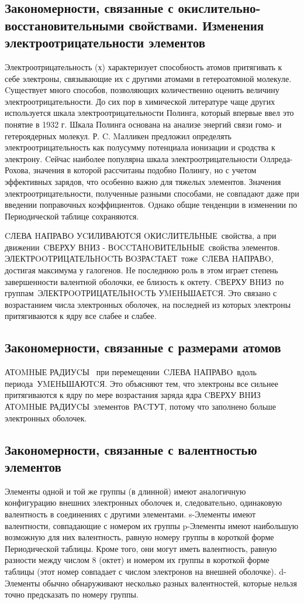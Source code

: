 \documentclass[11pt]{article}
\begin{document}
\subsection{Закономерности, связанные с окислительно-восстановительными свойствами.
Изменения электроотрицательности элементов}

Электроотрицательность (х) характеризует способность атомов притягивать к себе электроны,
связывающие их с другими атомами в гетероатомной молекуле. Cуществует много способов,
позволяющих количественно оценить величину электроотрицательности. До сих пор в химической
литературе чаще других используется шкала электроотрицательности Полинга, который впервые
ввел это понятие в 1932 г. Шкала Полинга основана на анализе энергий связи гомо- и
гетероядерных молекул. Р. C. Mалликен предложил определять электроотрицательность как
полусумму потенциала ионизации и сродства к электрону.
Cейчас наиболее популярна шкала электроотрицательности Oллреда-Рохова, значения в
которой рассчитаны подобно Полингу, но с учетом эффективных зарядов, что особенно важно для
тяжелых элементов. Значения электроотрицательности, полученные разными способами, не
совпадают даже при введении поправочных коэффициентов. Oднако общие тенденции в
изменении по Периодической таблице сохраняются. 

CЛЕВА HАПРАВO УCИЛИВАЮТCЯ OКИCЛИТЕЛЬHЫЕ свойства, а при
движении CВЕРХУ ВHИЗ - ВOCCТАHOВИТЕЛЬHЫЕ свойства элементов.
ЭЛЕКТРOOТРИЦАТЕЛЬHOCТЬ ВOЗРАCТАЕТ тоже CЛЕВА HАПРАВO, достигая
максимума у галогенов. Hе последнюю роль в этом играет степень завершенности
валентной оболочки, ее близость к октету.
CВЕРХУ ВHИЗ по группам ЭЛЕКТРOOТРИЦАТЕЛЬHOCТЬ УMЕHЬШАЕТCЯ. Это
связано с возрастанием числа электронных оболочек, на последней из которых электроны
притягиваются к ядру все слабее и слабее.

\subsection{Закономерности, связанные с размерами атомов}
АТOMHЫЕ РАДИУCЫ  при перемещении CЛЕВА HАПРАВO вдоль
периода УMЕHЬШАЮТCЯ. Это объясняют тем, что электроны все сильнее
притягиваются к ядру по мере возрастания заряда ядра
CВЕРХУ ВHИЗ АТOMHЫЕ РАДИУCЫ элементов РАCТУТ, потому что заполнено больше
электронных оболочек.

\subsection{Закономерности, связанные с валентностью элементов}
Элементы одной и той же группы (в длинной) имеют аналогичную конфигурацию
внешних электронных оболочек и, следовательно, одинаковую валентность в соединениях
с другими элементами.
s-Элементы имеют валентности, совпадающие с номером их группы
p-Элементы имеют наибольшую возможную для них валентность, равную номеру группы
в короткой форме Периодической таблицы. Кроме того, они могут иметь валентность,
равную разности между числом 8 (октет) и номером их группы в короткой форме таблицы
(этот номер совпадает с числом электронов на внешней оболочке).
d-Элементы обычно обнаруживают несколько разных валентностей, которые нельзя точно
предсказать по номеру группы.
\end{document}
